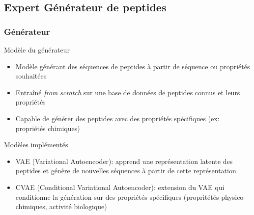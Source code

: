\subsection{Expert Générateur de peptides}
\begin{frame}
    \frametitle{Générateur}
    \begin{block}{Modèle du générateur}
        \begin{itemize}
        \item Modèle générant des séquences de peptides à partir de séquence ou propriétés souhaitées
        \item Entraîné \textit{from scratch} sur une base de données de peptides connus et leurs propriétés
        \item Capable de générer des peptides avec des propriétés spécifiques (ex: propriétés chimiques)
        \end{itemize}
    \end{block}

    \begin{block}{Modèles implémentés}
        \begin{itemize}
        \item VAE (Variational Autoencoder): apprend une représentation latente des peptides et génère de nouvelles séquences à partir de cette représentation
        \item CVAE (Conditional Variational Autoencoder): extension du VAE qui conditionne la génération sur des propriétés spécifiques (propritétés physico-chimiques, activité biologique)
    \end{itemize}
    \end{block}
\end{frame}

